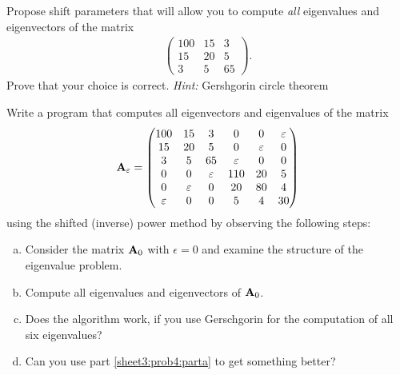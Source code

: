 \begin{Sheet}
  \begin{Problem}
    \label{problem:shift}
    Propose shift parameters that will allow you to compute
    \textit{all} eigenvalues and eigenvectors of the matrix
    \begin{gather*}
      \begin{pmatrix}
        100 & 15 & 3 \\
         15 & 20 & 5 \\
          3 &  5 & 65
      \end{pmatrix}
      .
    \end{gather*}
    Prove that your choice is correct.  \textit{Hint:} Gershgorin
    circle theorem
  \end{Problem}

  \begin{Problem}[Programming]
    Write a program that computes all eigenvectors and eigenvalues of
    the matrix
    \begin{gather*}
      \mathbf A_{\varepsilon} =
      \begin{pmatrix}
        100& 15& 3& 0& 0& \varepsilon \\
        15& 20& 5& 0& \varepsilon & 0 \\
        3& 5& 65& \varepsilon&  0& 0 \\
        0& 0& \varepsilon& 110& 20& 5 \\
        0& \varepsilon& 0& 20& 80& 4 \\
        \varepsilon& 0& 0& 5& 4& 30
      \end{pmatrix}
    \end{gather*}
    using the shifted (inverse) power method by observing the
    following steps:
    \begin{enumerate}[(a)]
    \item\label{sheet3:prob4:parta} Consider the matrix $\mathbf A_0$ with $\epsilon=0$ and examine
      the structure of the eigenvalue problem.
    \item Compute all eigenvalues and eigenvectors of $\mathbf A_0$.
    \item Does the algorithm work, if you use Gerschgorin for the computation of all six eigenvalues?
    \item Can you use part \eqref{sheet3:prob4:parta} to get something
        better?
    \end{enumerate}
  \end{Problem}
\end{Sheet}


